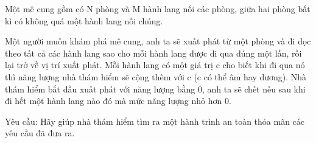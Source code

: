 Một mê cung gồm có N phòng và M hành lang nối các phòng, giữa hai phòng bất kì có không quá một hành lang nối chúng.

Một người muốn khám phá mê cung, anh ta sẽ xuất phát từ một phòng và đi dọc theo tất cả các hành lang sao cho mỗi hành lang được đi qua đúng một lần, rồi lại trở về vị trí xuất phát. Mỗi hành lang có một giá trị c cho biết khi đi qua nó thì năng lượng nhà thám hiểm sẽ cộng thêm với c (c có thể âm hay dương). Nhà thám hiểm bắt đầu xuất phát với năng lượng bằng 0, anh ta sẽ chết nếu sau khi đi hết một hành lang nào đó mà mức năng lượng nhỏ hơn 0.


Yêu cầu: Hãy giúp nhà thám hiểm tìm ra một hành trình an toàn thỏa mãn các yêu cầu đã đưa ra.